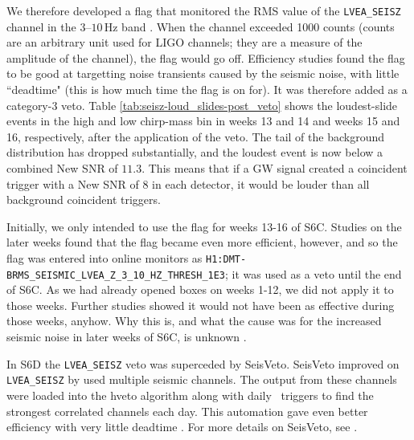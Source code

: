 We therefore developed a flag that monitored the RMS value of the
\verb|LVEA_SEISZ| channel in the $3$--$10\,$Hz band
\cite{detChar:LveaSeiszVeto}. When the channel exceeded 1000 counts (counts are
an arbitrary unit used for \ac{LIGO} channels; they are a measure of the
amplitude of the channel), the flag would go off. Efficiency studies found the
flag to be good at targetting noise transients caused by the seismic noise,
with little ``deadtime" (this is how much time the flag is on for). It was
therefore added as a category-3 veto. Table
\ref{tab:seisz-loud_slides-post_veto} shows the loudest-slide events in the
high and low chirp-mass bin in weeks 13 and 14 and weeks 15 and 16,
respectively, after the application of the veto. The tail of the background
distribution has dropped substantially, and the loudest event is now below a
combined New \ac{SNR} of $11.3$. This means that if a GW signal created a
coincident trigger with a New \ac{SNR} of $8$ in each detector, it would be
louder than all background coincident triggers.

Initially, we only intended to use the flag for weeks 13-16 of S6C. Studies on
the later weeks found that the flag became even more efficient, however, and so
the flag was entered into online monitors as
\verb|H1:DMT-BRMS_SEISMIC_LVEA_Z_3_10_HZ_THRESH_1E3|; it was used as a veto
until the end of S6C. As we had already opened boxes on weeks 1-12, we did not
apply it to those weeks. Further studies showed it would not have been as
effective during those weeks, anyhow. Why this is, and what the cause was for
the increased seismic noise in later weeks of S6C, is unknown
\cite{Lundgren:personal_comm}.

In S6D the \verb|LVEA_SEISZ| veto was superceded by SeisVeto. SeisVeto improved
on \verb|LVEA_SEISZ| by used multiple seismic channels. The output from these
channels were loaded into the hveto algorithm along with daily \ihope~triggers
to find the strongest correlated channels each day. This automation gave even
better efficiency with very little deadtime \cite{detChar:SeisVeto}. For more
details on SeisVeto, see \cite{Macleod:2011}.

